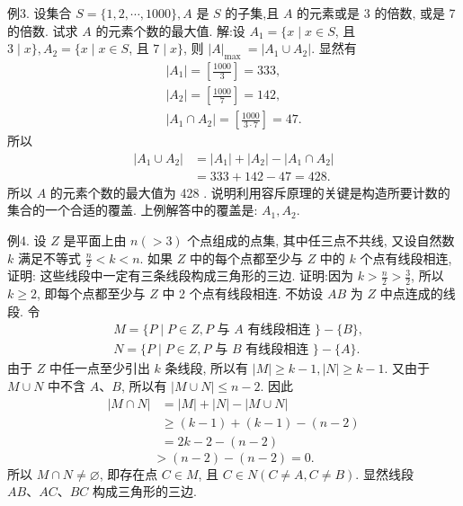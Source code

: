 例3. 设集合 $S=\{1,2, \cdots, 1000\}, A$ 是 $S$ 的子集,且 $A$ 的元素或是 3 的倍数, 或是 7 的倍数.
试求 $A$ 的元素个数的最大值.
解:设 $A_1=\{x \mid x \in S$, 且 $3 \mid x\}, A_2=\{x \mid x \in S$, 且 $7 \mid x\}$, 则 $|A|_{\text {max }}=\left|A_1 \cup A_2\right|$. 显然有
$$
\begin{gathered}
\left|A_1\right|=\left[\frac{1000}{3}\right]=333, \\
\left|A_2\right|=\left[\frac{1000}{7}\right]=142, \\
\left|A_1 \cap A_2\right|=\left[\frac{1000}{3 \cdot 7}\right]=47 .
\end{gathered}
$$
所以
$$
\begin{aligned}
\left|A_1 \cup A_2\right| & =\left|A_1\right|+\left|A_2\right|-\left|A_1 \cap A_2\right| \\
& =333+142-47=428 .
\end{aligned}
$$
所以 $A$ 的元素个数的最大值为 428 .
说明利用容斥原理的关键是构造所要计数的集合的一个合适的覆盖.
上例解答中的覆盖是: $A_1, A_2$.



例4. 设 $Z$ 是平面上由 $n(>3)$ 个点组成的点集, 其中任三点不共线, 又设自然数 $k$ 满足不等式 $\frac{n}{2}<k<n$. 如果 $Z$ 中的每个点都至少与 $Z$ 中的 $k$ 个点有线段相连,证明: 这些线段中一定有三条线段构成三角形的三边.
证明:因为 $k>\frac{n}{2}>\frac{3}{2}$, 所以 $k \geqslant 2$, 即每个点都至少与 $Z$ 中 2 个点有线段相连.
不妨设 $A B$ 为 $Z$ 中点连成的线段.
令
$$
\begin{aligned}
& M=\{P \mid P \in Z, P \text { 与 } A \text { 有线段相连 }\}-\{B\}, \\
& N=\{P \mid P \in Z, P \text { 与 } B \text { 有线段相连 }\}-\{A\} .
\end{aligned}
$$
由于 $Z$ 中任一点至少引出 $k$ 条线段, 所以有 $|M| \geqslant k-1,|N| \geqslant k-1$. 又由于 $M \cup N$ 中不含 $A 、 B$, 所以有 $|M \cup N| \leqslant n-2$. 因此
$$
\begin{aligned}
|M \cap N| & =|M|+|N|-|M \cup N| \\
& \geqslant(k-1)+(k-1)-(n-2) \\
& =2 k-2-(n-2)
\end{aligned}
$$
$$
>(n-2)-(n-2)=0 .
$$
所以 $M \cap N \neq \varnothing$, 即存在点 $C \in M$, 且 $C \in N(C \neq A, C \neq B)$. 显然线段 $A B 、 A C 、 B C$ 构成三角形的三边.



